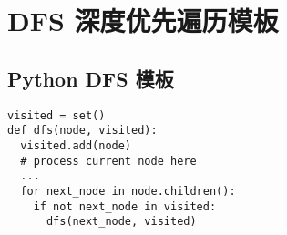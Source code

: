 \newpage
\section{DFS 深度优先遍历模板}

\subsection{Python DFS 模板}

\begin{verbatim}
visited = set()
def dfs(node, visited):
  visited.add(node)
  # process current node here
  ...
  for next_node in node.children():
    if not next_node in visited:
      dfs(next_node, visited)
\end{verbatim}
